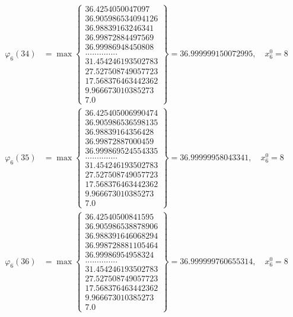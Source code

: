 \documentclass{article}
\begin{document}
\begin{align*}
  
  
  
\varphi_{6}(34) &= \max \left\{ \begin{array}{c}
36.4254050047097 \\
 36.905986534094126 \\
 36.98839163246341 \\
 36.99872884497569 \\
 36.99986948450808 \\
 .............. \\
 31.454246193502783 \\
 27.527508749057723 \\
 17.568376463442362 \\
 9.966673010385273 \\
 7.0
\end{array} \right\} = 36.999999150072995, \quad x_{6}^0 = 8\\
  
  
  
  
\varphi_{6}(35) &= \max \left\{ \begin{array}{c}
36.425405006990474 \\
 36.905986536598135 \\
 36.98839164356428 \\
 36.99872887000459 \\
 36.999869524554335 \\
 .............. \\
 31.454246193502783 \\
 27.527508749057723 \\
 17.568376463442362 \\
 9.966673010385273 \\
 7.0
\end{array} \right\} = 36.99999958043341, \quad x_{6}^0 = 8\\
  
  
  
  
\varphi_{6}(36) &= \max \left\{ \begin{array}{c}
36.42540500841595 \\
 36.905986538878906 \\
 36.988391646068294 \\
 36.998728881105464 \\
 36.99986954958324 \\
 .............. \\
 31.454246193502783 \\
 27.527508749057723 \\
 17.568376463442362 \\
 9.966673010385273 \\
 7.0
\end{array} \right\} = 36.999999760655314, \quad x_{6}^0 = 8\\
  
  
\end{align*}
\end{document}
